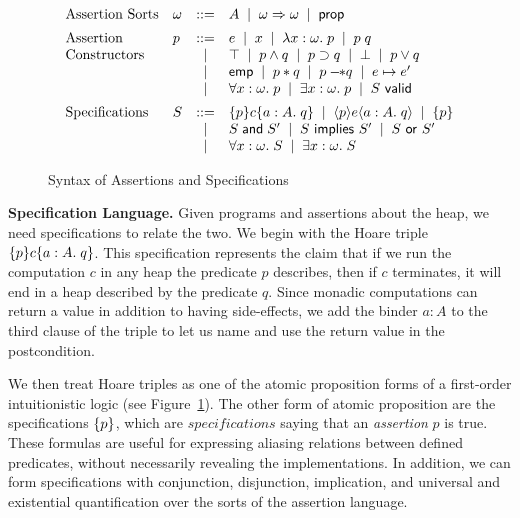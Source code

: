 \documentclass[preprint,natbib]{sigplanconf}
\begin{document}
\begin{figure}
\begin{displaymath}
\begin{array}{llcl}
\mbox{Assertion Sorts} & 
\omega & ::= & A \;\;|\;\; \omega \Rightarrow \omega \;\;|\;\; \mbox{\textsf{{prop}}} 
\\[0.5em]
\mbox{Assertion} & 
p & ::= & e \;\;|\;\; x \;\;|\;\; \lambda x:\omega.\;p \;\;|\;\; p\;q \\
\mbox{Constructors}
& &  |  & \top \;\;|\;\; p \land q \;\;|\;\; p \supset q 
          \;\;|\;\; \bot \;\;|\;\; p \vee q \\
& &  |  &  \mathsf{emp} \;\;|\;\; p * q \;\;|\;\; p -\!\!* q \;\;|\;\; e \mapsto e' \\
& &  |  & \forall x:\omega.\; p \;\;|\;\; \exists x:\omega.\; p \;\;|\;\;
          {S}\mbox{\textsf{{ valid}}} 
\\[0.5em]
\mbox{Specifications} &
S & ::= & \{{p}\}{c}\{{a:A}.\;{q}\} \;\;|\;\; \langle{p}\rangle{e}\langle{a:A}.\;{q}\rangle \;\;|\;\; \{{p}\} \\
& &  |  & S \;\mbox{\textsf{{and}}}\; S' \;\;|\;\; S \mbox{\textsf{{ implies }}} S' \;\;|\;\; S \mbox{\textsf{{ or }}} S' \\
& &  |  & \forall x:\omega.\; S \;\;|\;\; \exists x:\omega.\;S 
\\
\end{array}
\end{displaymath}
\caption{Syntax of Assertions and Specifications}
\label{assert-syntax}
\end{figure}

\textbf{Specification Language.} Given programs and assertions about
the heap, we need specifications to relate the two. We begin with the
Hoare triple $\{{p}\}{c}\{{a:A}.\;{q}\}$. This specification represents the
claim that if we run the computation $c$ in any heap the predicate $p$
describes, then if $c$ terminates, it will end in a heap described by
the predicate $q$. Since monadic computations can return a value in
addition to having side-effects, we add the binder $a:A$ to the third
clause of the triple to let us name and use the return value in the
postcondition.

We then treat Hoare triples as one of the atomic proposition forms of
a first-order intuitionistic logic (see
Figure~\ref{assert-syntax}). The other form of atomic proposition are
the specifications $\{{p}\}$, which are $specifications$ saying that
an \emph{assertion} $p$ is true. These formulas are useful for
expressing aliasing relations between defined predicates, without
necessarily revealing the implementations. In addition, we can form
specifications with conjunction, disjunction, implication, and
universal and existential quantification over the sorts of the
assertion language. 
\end{document}

